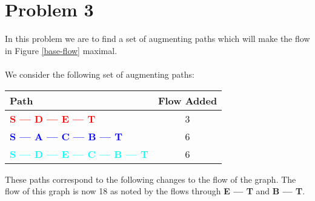 \section*{Problem 3}

In this problem we are to find a set of augmenting paths which will 
make the flow in Figure \ref{base-flow} maximal. 
\\
\\
We consider the following set of augmenting paths:
\begin{center}
    \begin{tabular}{ l | c }
    \textbf{Path} & \textbf{Flow Added} \\
    \hline
    \textcolor{red}{\textbf{S --- D --- E --- T}} & 3 \\
    \textcolor{blue}{\textbf{S --- A --- C --- B --- T}} & 6 \\
    \textcolor{cyan}{\textbf{S --- D --- E --- C --- B --- T}} & 6 \\
    \end{tabular}
\end{center}
%
These paths correspond to the following changes to the flow of the
graph. The flow of this graph is now 18 as noted by the flows through 
\textbf{E --- T} and \textbf{B --- T}.
%
